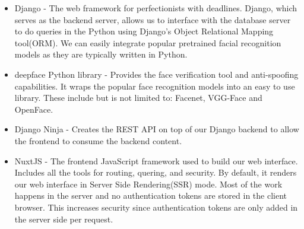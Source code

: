 \begin{itemize}
	\item	Django - The web framework for perfectionists with deadlines. Django, which serves as the backend server, allows us to interface with the database server to do queries in the Python using Django's Object Relational Mapping tool(ORM). We can easily integrate popular pretrained facial recognition models as they are typically written in Python.
\end{itemize}

\begin{itemize}
	\item	deepface Python library - Provides the face verification tool and anti-spoofing capabilities. It wraps the popular face recognition models into an easy to use library. These include but is not limited to: Facenet, VGG-Face and OpenFace.
\end{itemize}

\begin{itemize}
	\item	Django Ninja - Creates the REST API on top of our Django backend to allow the frontend to consume the backend content.
\end{itemize}

\begin{itemize}
	\item	NuxtJS - The frontend JavaScript framework used to build our web interface. Includes all the tools for routing, quering, and security. By default, it renders our web interface in Server Side Rendering(SSR) mode. Most of the work happens in the server and no authentication tokens are stored in the client browser. This increases security since authentication tokens are only added in the server side per request.
\end{itemize}
	
